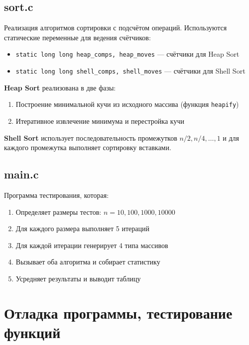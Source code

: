 \documentclass[a4paper,12pt,titlepage]{article}
\begin{document}
\subsection{sort.c}

Реализация алгоритмов сортировки с подсчётом операций. Используются статические переменные для ведения счётчиков:

\begin{itemize}
    \item \texttt{static long long heap\_comps, heap\_moves} — счётчики для Heap Sort
    \item \texttt{static long long shell\_comps, shell\_moves} — счётчики для Shell Sort
\end{itemize}

\textbf{Heap Sort} реализована в две фазы:
\begin{enumerate}
    \item Построение минимальной кучи из исходного массива (функция \texttt{heapify})
    \item Итеративное извлечение минимума и перестройка кучи
\end{enumerate}

\textbf{Shell Sort} использует последовательность промежутков $n/2, n/4, \ldots, 1$ и для каждого промежутка выполняет сортировку вставками.

\subsection{main.c}

Программа тестирования, которая:

\begin{enumerate}
    \item Определяет размеры тестов: $n = 10, 100, 1000, 10000$
    \item Для каждого размера выполняет 5 итераций
    \item Для каждой итерации генерирует 4 типа массивов
    \item Вызывает оба алгоритма и собирает статистику
    \item Усредняет результаты и выводит таблицу
\end{enumerate}

\newpage

\section{Отладка программы, тестирование функций}
\end{document}
